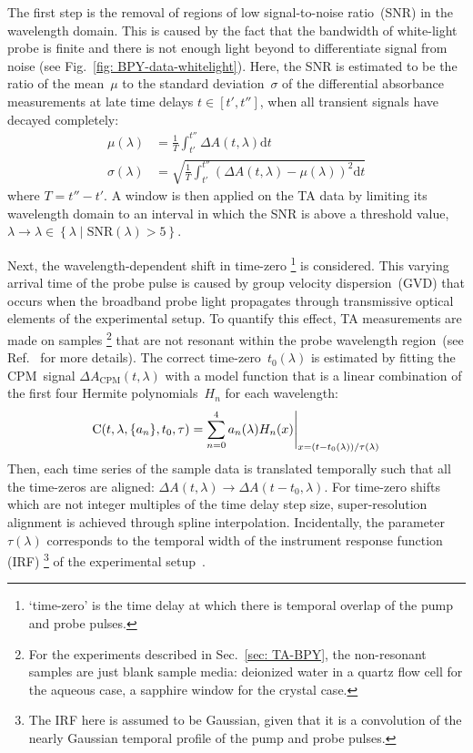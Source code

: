 The first step is the removal of regions of low signal-to-noise ratio~(SNR)
in the wavelength domain. This is caused by the fact that the bandwidth of white-light probe
is finite and there is not enough light beyond to differentiate signal from noise (see Fig.~\ref{fig: BPY-data-whitelight}).
Here, the SNR is estimated to be the ratio of the mean~$\mu$ to the standard deviation~$\sigma$
of the differential absorbance measurements at late time delays $t \in [t', t'']$,
when all transient signals have decayed completely:
%
\begin{equation}
  \begin{aligned}
    \mu(\lambda) & = \frac{1}{T} \int_{t'}^{t''} \Delta A(t, \lambda) \mathrm{d}t  \\
    \sigma(\lambda) & = \sqrt{\frac{1}{T} \int_{t'}^{t''} \left( \Delta A (t, \lambda) - \mu(\lambda) \right)^2 \mathrm{d}t}
    \label{eq: mu-sigma-SNR}
  \end{aligned}
\end{equation}
%
where $T = t'' - t'$.
A window is then applied on the TA data by limiting its wavelength domain to an interval
in which the SNR is above a threshold value,
$\lambda \rightarrow \lambda \in \left\{ \lambda \mid \textrm{SNR}(\lambda) > 5 \right\}$.

Next, the wavelength-dependent shift in time-zero%
\footnote{`time-zero' is the time delay at which there is temporal overlap of the pump and probe pulses.}
is considered. This varying arrival time of the probe pulse is caused by group velocity dispersion~(GVD)
that occurs when the broadband probe light propagates through transmissive optical elements
of the experimental setup. To quantify this effect, TA measurements are made on samples%
\footnote{For the experiments described in Sec.~\ref{sec: TA-BPY}, the non-resonant samples
are just blank sample media: deionized water in a quartz flow cell for the aqueous case,
a sapphire window for the crystal case.} that are not resonant
within the probe wavelength region~(see Ref.~\cite{Ryan-thesis} for more details).
The correct time-zero~$t_0(\lambda)$ is estimated by fitting
the CPM~signal $\Delta A_\textrm{CPM}(t, \lambda)$ with a model function that is
a linear combination of the first four Hermite polynomials~$H_n$ for each wavelength:
%
\begin{equation}
  \textrm{C}(t, \lambda, \{a_n\}, t_0, \tau) =
    \sum_{n = 0}^4 a_n(\lambda) H_n(x) \Bigg\rvert_{x = (t - t_0(\lambda))/\tau(\lambda)}\\
  \label{eq: CPM-fit}
\end{equation}
%
Then, each time series of the sample data is translated temporally
such that all the time-zeros are aligned: $\Delta A(t, \lambda) \rightarrow \Delta A(t - t_0, \lambda)$.
For time-zero shifts which are not integer multiples of the time delay step size,
super-resolution alignment is achieved through spline interpolation.
Incidentally, the parameter $\tau(\lambda)$ corresponds to the temporal width
of the instrument response function (IRF)%
\footnote{The IRF here is assumed to be Gaussian, given that it is a convolution of
the nearly Gaussian temporal profile of the pump and probe pulses.} of the experimental
setup~\cite{Megerle2009}.

